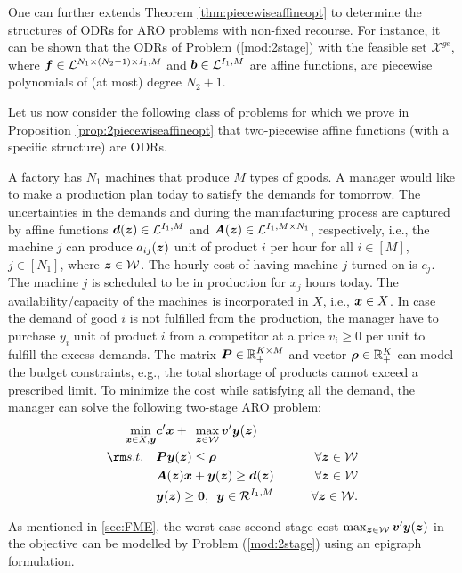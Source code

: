 \documentclass[fleqn,isre,blindrev]{informs4}
\newcommand{\mb}[1]{\mbox{\boldmath \ensuremath{#1}}}
\begin{document}
\iffalse

 {  One can further extends Theorem \ref{thm:piecewiseaffineopt} to determine the structures of ODRs for ARO problems with non-fixed recourse.  For instance, it can be shown that the ODRs of Problem (\ref{mod:2stage}) with the feasible set $\mathcal{X}^{ge}$, where $\mb{f} \in \mathcal{L}^{N_1 \times (N_2-1) \times I_1, M}$ and  $\mb{b} \in \mathcal{L}^{I_1,M}$ are affine functions, are piecewise polynomials of (at most) degree $N_2+1$. } 


Let us now consider the following class of problems for which we prove in Proposition \ref{prop:2piecewiseaffineopt} that two-piecewise affine functions (with a specific structure) are ODRs.

	\begin{example} 
		A factory has $N_1$ machines that produce $M$ types of goods. A manager would like to make a production plan today to satisfy the demands for tomorrow. The uncertainties in the demands and during the manufacturing process are captured by affine functions $\mb{d}(\mb{z}) \in \mathcal{L}^{I_1,M}$ and $\mb{A}(\mb{z}) \in \mathcal{L}^{I_1, M\times N_1}$, respectively, i.e., the machine $j$ can produce $a_{ij}(\mb{z})$ unit of product $i$ per hour for all $i\in [M]$, $j\in [N_1]$, where $\mb{z} \in \mathcal{W}$. The hourly cost of having machine $j$ turned on is $c_j$. The machine $j$ is scheduled to be in production for $x_j$ hours today. The availability/capacity of the machines is incorporated in $X$, i.e., $\mb{x}\in X$.  In case the demand of good $i$ is not fulfilled from the production, the manager have to purchase $y_i$ unit of product $i$ from a competitor at a price $v_{i} \ge 0$ per unit to fulfill the excess demands. The  matrix $\mb{P} \in \mathbb{R}^{K\times M}_+$ and  vector $\mb{\rho}\in \mathbb{R}^{K}_+$ can model the budget constraints, e.g., the total shortage of products cannot exceed a prescribed limit. To minimize the cost while satisfying all the demand, the manager can solve the following two-stage ARO problem:
\begin{equation}\label{p:production}
			\begin{aligned} 
				\min_{ \boldsymbol{x} \in X,  \boldsymbol{y}}  &  \mb{c}'\mb{x} +  \enskip \max_{ \boldsymbol{z} \in \mathcal{W}} \mb{v}'\mb{y}(\mb{z}) \\
				{\rm s.t.} \quad  &   \mb{P}\mb{y}(\mb{z}) \le \mb{\rho} \qquad & \forall \mb{z} \in \mathcal{W} \\
				& \mb{A}(\mb{z})\mb{x} + \mb{y}(\mb{z}) \ge \mb{d}(\mb{z}) \qquad & \forall \mb{z} \in \mathcal{W} \\
				& \mb{y}(\mb{z}) \ge \mb{0}, \,\,\,  \mb{y} \in \mathcal{R}^{I_1,M} & \forall \mb{z} \in \mathcal{W}. 
			\end{aligned}
\end{equation}
		 \hfill \Halmos
		
        As mentioned in \textsection \ref{sec:FME}, the worst-case second stage cost $ \max_{ \boldsymbol{z} \in \mathcal{W} } \mb{v}'\mb{y}(\mb{z})$ in the objective can be modelled by Problem (\ref{mod:2stage}) using an epigraph formulation. 
	\end{example} 
	
\end{document}
